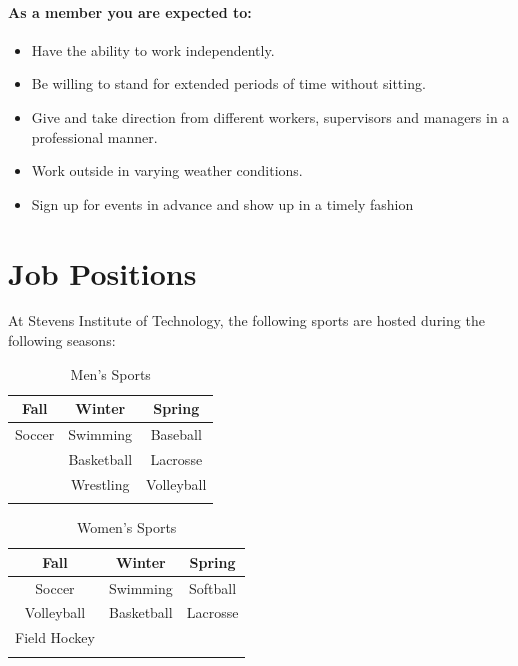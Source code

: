 \documentclass{article}
\begin{document}
\paragraph{As a member you are expected to:}
\begin{itemize}
    \item Have the ability to work independently.
    \item Be willing to stand for extended periods of time without sitting.
    \item Give and take direction from different workers, supervisors and managers in a professional manner.
    \item Work outside in varying weather conditions.
    \item Sign up for events in advance and show up in a timely fashion
\end{itemize}

\tableofcontents
\newpage

\section{Job Positions}
At Stevens Institute of Technology, the following sports are hosted during the following seasons: 

\def\arraystretch{1.25}
\begin{table}[h]
    \centering
    \begin{tabular}{c|c|c}
        Fall & Winter & Spring\\
        \hline
        Soccer & Swimming & Baseball\\
         & Basketball & Lacrosse\\
         & Wrestling & Volleyball\\
        & & \\
    \end{tabular}
    \caption{Men's Sports}
\end{table}

\begin{table}[h]
    \centering
    \begin{tabular}{c|c|c}
        Fall & Winter & Spring\\
        \hline
        Soccer & Swimming & Softball\\
        Volleyball & Basketball & Lacrosse\\
        Field Hockey & & \\
        & & \\
    \end{tabular}
    \caption{Women's Sports}
\end{table}
\end{document}
